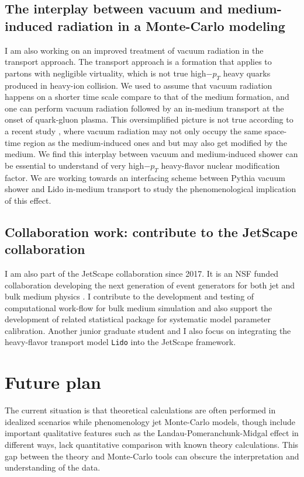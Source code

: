 \documentclass[10pt,a4paper]{article}
\begin{document}
\subsection{The interplay between vacuum and medium-induced radiation in a Monte-Carlo modeling}

I am also working on an improved treatment of vacuum radiation in the transport approach. The transport approach is a formation that applies to partons with negligible virtuality, which is not true high$-p_T$ heavy quarks produced  in heavy-ion collision. 
We used to assume that vacuum radiation happens on a shorter time scale compare to that of the medium formation, and one can perform vacuum radiation followed by an in-medium transport at the onset of quark-gluon plasma.
This oversimplified picture is not true according to a recent study \cite{Caucal:2018dla}, where vacuum radiation may not only occupy the same space-time region as the medium-induced ones and but may also get modified by the medium.
We find this interplay between vacuum and medium-induced shower can be essential to understand of very high$-p_T$ heavy-flavor nuclear modification factor. 
We are working towards an interfacing scheme between Pythia vacuum shower and Lido in-medium transport to study the phenomenological implication of this effect.

\subsection{  Collaboration work: contribute to the JetScape collaboration}

I am also part of the JetScape collaboration since 2017. It is an NSF funded collaboration developing the next generation of event generators for both jet and bulk medium physics \cite{JetScape}. 
I contribute to the development and testing of computational work-flow for bulk medium simulation and also support the development of related statistical package for systematic model parameter calibration.
Another junior graduate student and I also focus on integrating the heavy-flavor transport model {\tt Lido} into the JetScape framework.

\section{Future plan}
The current situation is that theoretical calculations are often performed in idealized scenarios while phenomenology jet Monte-Carlo models, though include important qualitative features such as the Landau-Pomeranchunk-Midgal effect in different ways, lack quantitative comparison with known theory calculations.
This gap between the theory and Monte-Carlo tools can obscure the interpretation and understanding of the data.
\end{document}
